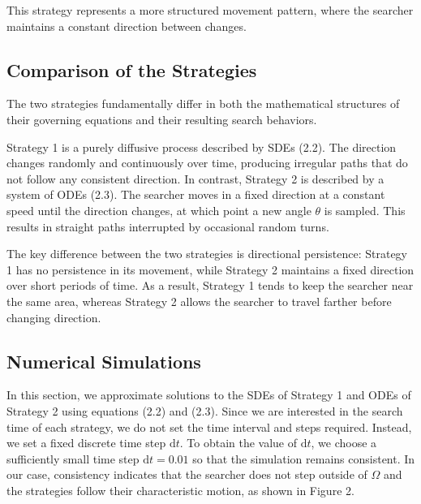 \documentclass{article}
\begin{document}
\vspace{5mm}

\noindent This strategy represents a more structured movement pattern, where the searcher maintains a constant direction between changes.

\subsection{Comparison of the Strategies}
\noindent The two strategies fundamentally differ in both the mathematical structures of their governing equations and their resulting search behaviors.

\vspace{5mm}

\noindent Strategy 1 is a purely diffusive process described by SDEs (2.2). The direction changes randomly and continuously over time, producing irregular paths that do not follow any consistent direction. In contrast, Strategy 2 is described by a system of ODEs (2.3). The searcher moves in a fixed direction at a constant speed until the direction changes, at which point a new angle $\theta$ is sampled. This results in straight paths interrupted by occasional random turns.

\vspace{5mm}

\noindent The key difference between the two strategies is directional persistence: Strategy 1 has no persistence in its movement, while Strategy 2 maintains a fixed direction over short periods of time. As a result, Strategy 1 tends to keep the searcher near the same area, whereas Strategy 2 allows the searcher to travel farther before changing direction.

\subsection{Numerical Simulations}
In this section, we approximate solutions to the SDEs of Strategy 1 and ODEs of Strategy 2 using equations (2.2) and (2.3). Since we are interested in the search time of each strategy, we do not set the time interval and steps required. Instead, we set a fixed discrete time step $\mathrm{d}t$. To obtain the value of $\mathrm{d}t$, we choose a sufficiently small time step $\mathrm{d}t = 0.01$ so that the simulation remains consistent. In our case, consistency indicates that the searcher does not step outside of $\Omega$ and the strategies follow their characteristic motion, as shown in Figure 2. 
\end{document}

